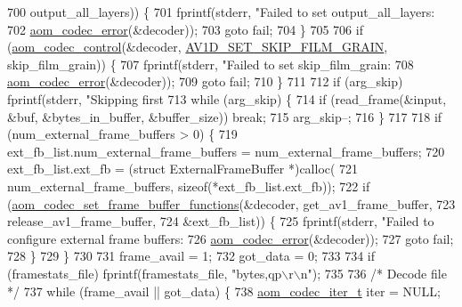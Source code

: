 \begin{DoxyCodeInclude}
{{{{{{{{{{{{{{{{{{{{{{{{{{{{{{{{{{{{700                         output\_all\_layers)) \{
701     fprintf(stderr, \textcolor{stringliteral}{"Failed to set output\_all\_layers: %
702             \hyperlink{group__codec_ga50949c0854605c722832bbfb0803f5f4}{aom\_codec\_error}(&decoder));
703     \textcolor{keywordflow}{goto} fail;
704   \}
705 
706   \textcolor{keywordflow}{if} (\hyperlink{group__codec_ga6da974f4eeaba1fa74106b28d0fe6ac5}{aom\_codec\_control}(&decoder, \hyperlink{group__aom__decoder_gga3865fd4b3192489baa9a5c3632ebe97ba17fa09c9ce1ae4a68eae21efd219418b}{AV1D\_SET\_SKIP\_FILM\_GRAIN}, 
      skip\_film\_grain)) \{
707     fprintf(stderr, \textcolor{stringliteral}{"Failed to set skip\_film\_grain: %
708             \hyperlink{group__codec_ga50949c0854605c722832bbfb0803f5f4}{aom\_codec\_error}(&decoder));
709     \textcolor{keywordflow}{goto} fail;
710   \}
711 
712   \textcolor{keywordflow}{if} (arg\_skip) fprintf(stderr, \textcolor{stringliteral}{"Skipping first %
713   \textcolor{keywordflow}{while} (arg\_skip) \{
714     \textcolor{keywordflow}{if} (read\_frame(&input, &buf, &bytes\_in\_buffer, &buffer\_size)) \textcolor{keywordflow}{break};
715     arg\_skip--;
716   \}
717 
718   \textcolor{keywordflow}{if} (num\_external\_frame\_buffers > 0) \{
719     ext\_fb\_list.num\_external\_frame\_buffers = num\_external\_frame\_buffers;
720     ext\_fb\_list.ext\_fb = (\textcolor{keyword}{struct }ExternalFrameBuffer *)calloc(
721         num\_external\_frame\_buffers, \textcolor{keyword}{sizeof}(*ext\_fb\_list.ext\_fb));
722     \textcolor{keywordflow}{if} (\hyperlink{group__cap__external__frame__buffer_ga1818a812e4d1e70eeafbe5b0ee538d6e}{aom\_codec\_set\_frame\_buffer\_functions}(&decoder, 
      get\_av1\_frame\_buffer,
723                                              release\_av1\_frame\_buffer,
724                                              &ext\_fb\_list)) \{
725       fprintf(stderr, \textcolor{stringliteral}{"Failed to configure external frame buffers: %
726               \hyperlink{group__codec_ga50949c0854605c722832bbfb0803f5f4}{aom\_codec\_error}(&decoder));
727       \textcolor{keywordflow}{goto} fail;
728     \}
729   \}
730 
731   frame\_avail = 1;
732   got\_data = 0;
733 
734   \textcolor{keywordflow}{if} (framestats\_file) fprintf(framestats\_file, \textcolor{stringliteral}{"bytes,qp\(\backslash\)r\(\backslash\)n"});
735 
736   \textcolor{comment}{/* Decode file */}
737   \textcolor{keywordflow}{while} (frame\_avail || got\_data) \{
738     \hyperlink{group__codec_gadf9e173c9e02788a9999399edab20a02}{aom\_codec\_iter\_t} iter = NULL;
}}}}}}}}}}}}}}}}}}}}}}}}}}}}}}}}}}}}}}}}
\end{DoxyCodeInclude}

